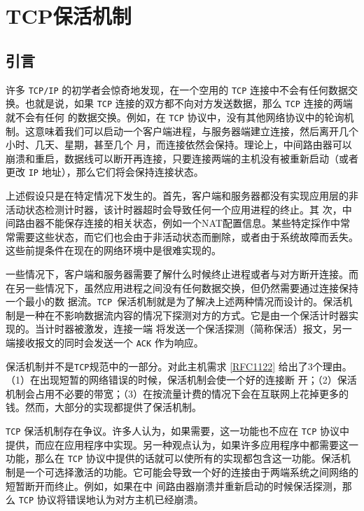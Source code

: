 \chapter{TCP保活机制}

\section{引言}
许多 \verb|TCP/IP| 的初学者会惊奇地发现，在一个空用的 \verb|TCP| 连接中不会有任何数据交换。也就是说，如果 \verb|TCP| 连接的双方都不向对方发送数据，那么 \verb|TCP| 连接的两端就不会有任何
的数据交换。例如，在 \verb|TCP| 协议中，没有其他网络协议中的轮询机制。这意味着我们可以启动一个客户端进程，与服务器端建立连接，然后离开几个小时、几天、星期，甚至几个
月，而连接依然会保持。理论上，中间路由器可以崩溃和重启，数据线可以断开再连接，只要连接两端的主机没有被重新启动（或者更改 \verb|IP| 地址），那么它们将会保持连接状态。

\begin{tcolorbox}
    上述假设只是在特定情况下发生的。首先，客户端和服务器都没有实现应用层的非活动状态检测计时器，该计时器超时会导致任何一个应用进程的终止。其
    次，中间路由器不能保存连接的相关状态，例如一个NAT配置信息。某些特定採作中常常需要这些状态，而它们也会由于非活动状态而删除，或者由于系统故障而丢失。
    这些前提条件在现在的网络环境中是很难实现的。
\end{tcolorbox}

一些情况下，客户端和服务器需要了解什么时候终止进程或者与对方断开连接。而在另一些情况下，虽然应用进程之间没有任何数据交换，但仍然需要通过连接保持一个最小的数
据流。\verb|TCP |保活机制就是为了解决上述两种情况而设计的。保活机制是一种在不影响数据流内容的情况下探测对方的方式。它是由一个保活计时器实现的。当计时器被激发，连接一端
将发送一个保活探测（简称保活）报文，另一端接收报文的同时会发送一个 \verb|ACK| 作为响应。

\begin{tcolorbox}
    保活机制并不是\verb|TCP|规范中的一部分。对此主机需求 \href{https://www.rfc-editor.org/rfc/rfc1122}{[RFC1122]} 给出了3个理由。（1）在出现短暂的网络错误的时候，保活机制会使一个好的连接断
    开；（2）保活机制会占用不必要的带宽；（3）在按流量计费的情况下会在互联网上花掉更多的钱。然而，大部分的实现都提供了保活机制。
\end{tcolorbox}

\verb|TCP| 保活机制存在争议。许多人认为，如果需要，这一功能也不应在 \verb|TCP| 协议中提供，而应在应用程序中实现。另一种观点认为，如果许多应用程序中都需要这一功能，那么在
\verb|TCP| 协议中提供的话就可以使所有的实现都包含这一功能。保活机制是一个可选择激活的功能。它可能会导致一个好的连接由于两端系统之间网络的短暂断开而终止。例如，如果在中
间路由器崩溃并重新启动的时候保活探测，那么 \verb|TCP| 协议将错误地认为对方主机已经崩溃。

